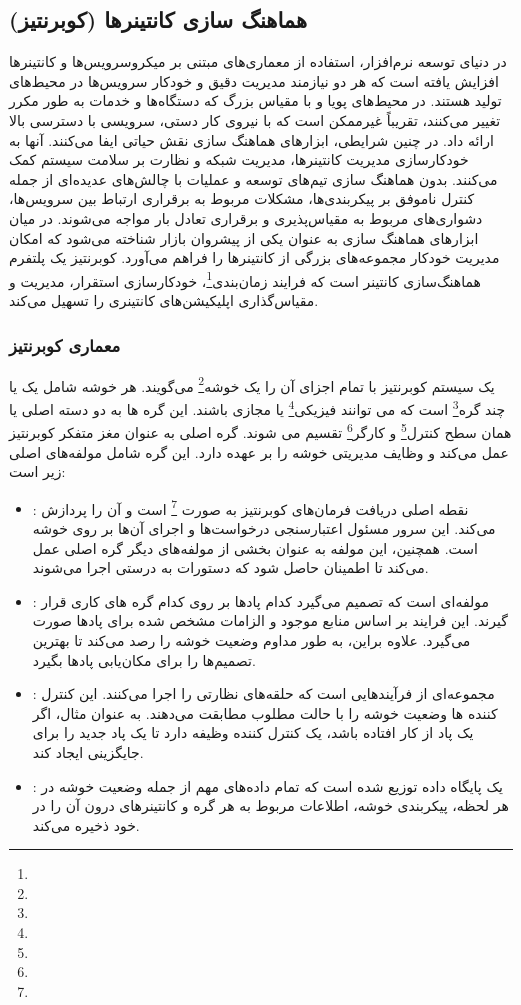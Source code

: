 \subsection{هماهنگ سازی کانتینرها (کوبرنتیز)}

در دنیای توسعه نرم‌افزار، استفاده از معماری‌های مبتنی بر میکروسرویس‌ها و کانتینرها افزایش یافته است که هر دو نیازمند مدیریت دقیق و خودکار سرویس‌ها در محیط‌های تولید هستند. در محیط‌های پویا و با مقیاس بزرگ که دستگاه‌ها و خدمات به طور مکرر تغییر می‌کنند، تقریباً غیرممکن است که با نیروی کار دستی، سرویسی با دسترسی بالا ارائه داد. در چنین شرایطی، ابزارهای هماهنگ سازی نقش حیاتی ایفا می‌کنند. آنها به خودکارسازی مدیریت کانتینرها، مدیریت شبکه و نظارت بر سلامت سیستم کمک می‌کنند. بدون هماهنگ سازی تیم‌های توسعه و عملیات با چالش‌های عدیده‌ای از جمله کنترل ناموفق بر پیکربندی‌ها، مشکلات مربوط به برقراری ارتباط بین سرویس‌ها، دشواری‌های مربوط به مقیاس‌پذیری و برقراری تعادل بار مواجه می‌شوند. در میان ابزارهای هماهنگ سازی  به عنوان یکی از پیشروان بازار شناخته می‌شود که امکان مدیریت خودکار مجموعه‌های بزرگی از کانتینرها را فراهم می‌آورد. کوبرنتیز یک پلتفرم هماهنگ‌سازی کانتینر است که فرایند زمان‌بندی\footnote{}، خودکارسازی استقرار، مدیریت و مقیاس‌گذاری اپلیکیشن‌های کانتینری را تسهیل می‌کند.

\subsubsection{معماری کوبرنتیز}
یک سیستم کوبرنتیز با تمام اجزای آن را یک خوشه\footnote{} می‌گویند. هر خوشه شامل یک یا چند گره\footnote{} است که می توانند فیزیکی\footnote{} یا مجازی باشند. این گره ها به دو دسته اصلی یا همان سطح کنترل\footnote{} و کارگر\footnote{} تقسیم می شوند.
گره اصلی به عنوان مغز متفکر کوبرنتیز عمل می‌کند و وظایف مدیریتی خوشه را بر عهده دارد. این گره شامل مولفه‌های اصلی زیر است:
\begin{itemize}
	\item 
{}: 
نقطه اصلی دریافت فرمان‌های کوبرنتیز به صورت \footnote{} است و آن را پردازش می‌کند. این سرور مسئول اعتبارسنجی درخواست‌ها و اجرای آن‌ها بر روی خوشه است. همچنین، این مولفه به عنوان بخشی از مولفه‌های دیگر گره اصلی عمل می‌کند تا اطمینان حاصل شود که دستورات به درستی اجرا می‌شوند.
	\item 
{}: 
مولفه‌ای است که تصمیم می‌گیرد کدام پادها بر روی کدام گره های کاری قرار گیرند. این فرایند بر اساس منابع موجود و الزامات مشخص شده برای پادها صورت می‌گیرد. علاوه براین، به طور مداوم وضعیت خوشه را رصد می‌کند تا بهترین تصمیم‌ها را برای مکان‌یابی پادها بگیرد.
	\item 
{}:
مجموعه‌ای از فرآیند‌هایی است که حلقه‌های نظارتی را اجرا می‌کنند. این کنترل کننده ها وضعیت خوشه را با حالت مطلوب مطابقت می‌دهند. به عنوان مثال، اگر یک پاد از کار افتاده باشد، یک کنترل کننده وظیفه دارد تا یک پاد جدید را برای جایگزینی ایجاد کند.
	\item 
{}: 
یک پایگاه داده توزیع شده است که تمام داده‌های مهم از جمله وضعیت خوشه در هر لحظه، پیکربندی خوشه، اطلاعات مربوط به هر گره و کانتینرهای درون آن را در خود ذخیره می‌کند. 
\end{itemize}

